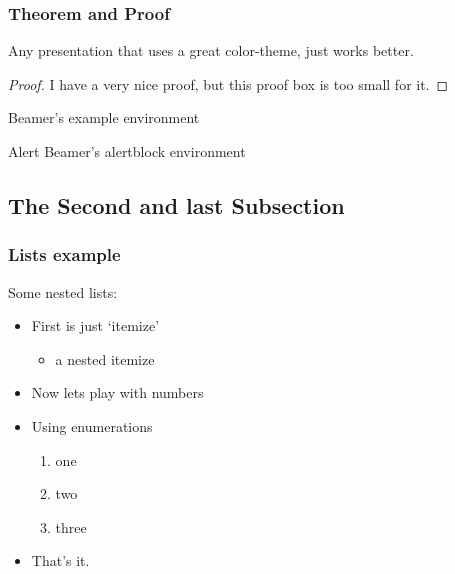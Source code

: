 \documentclass[t]{beamer}
\begin{document}
\begin{frame}\frametitle{Theorem and Proof}

\begin{theorem}
Any presentation that uses a great color-theme, just works better.
\end{theorem}


\begin{proof}
I have a very nice proof, but this proof box is too small for it.
\end{proof}


\begin{example}
Beamer's example environment
\end{example}

\begin{alertblock}{Alert}
Beamer's alertblock environment
\end{alertblock}

\end{frame}




\subsection{The Second and last Subsection}
\begin{frame}\frametitle{Lists example}
Some nested lists:
\begin{itemize}
\item First is just `itemize'
  \begin{itemize}
  \item a nested itemize
  \end{itemize}
\item Now lets play with numbers
\item Using enumerations
\begin{enumerate}
\item one
\item two
\item three
\end{enumerate}
\item That's it.
\end{itemize}

\end{frame}
\end{document}
